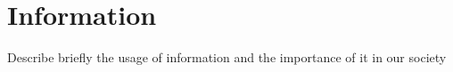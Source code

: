\section{Information}
Describe briefly the usage of information and the importance of it in our society
